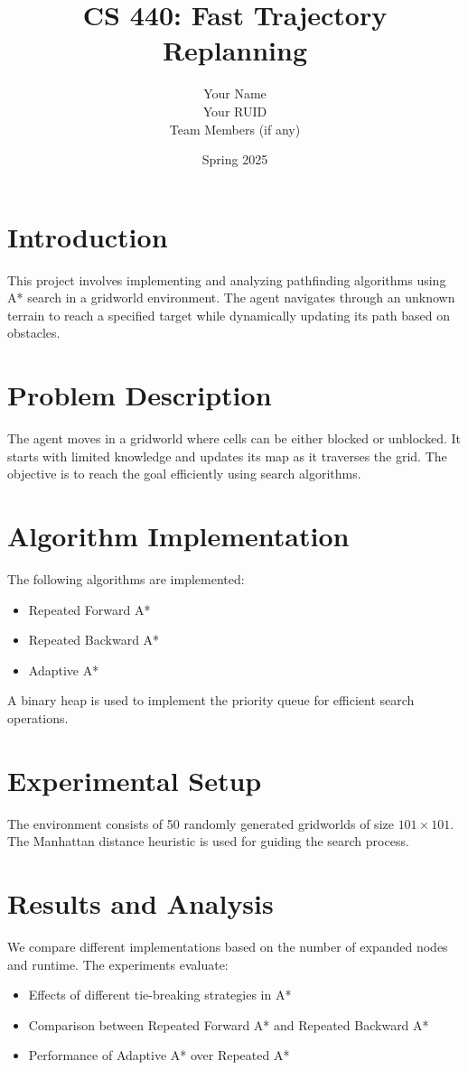\documentclass{article}
\title{CS 440: Fast Trajectory Replanning}
\author{Your Name \\ Your RUID \\ Team Members (if any)}
\date{Spring 2025}
\begin{document}
\maketitle

\section{Introduction}
This project involves implementing and analyzing pathfinding algorithms using A* search in a gridworld environment. The agent navigates through an unknown terrain to reach a specified target while dynamically updating its path based on obstacles.

\section{Problem Description}
The agent moves in a gridworld where cells can be either blocked or unblocked. It starts with limited knowledge and updates its map as it traverses the grid. The objective is to reach the goal efficiently using search algorithms.

\section{Algorithm Implementation}
The following algorithms are implemented:
\begin{itemize}
    \item Repeated Forward A*
    \item Repeated Backward A*
    \item Adaptive A*
\end{itemize}
A binary heap is used to implement the priority queue for efficient search operations.

\section{Experimental Setup}
The environment consists of 50 randomly generated gridworlds of size $101 \times 101$. The Manhattan distance heuristic is used for guiding the search process.

\section{Results and Analysis}
We compare different implementations based on the number of expanded nodes and runtime. The experiments evaluate:
\begin{itemize}
    \item Effects of different tie-breaking strategies in A*
    \item Comparison between Repeated Forward A* and Repeated Backward A*
    \item Performance of Adaptive A* over Repeated A*
\end{itemize}
\end{document}
